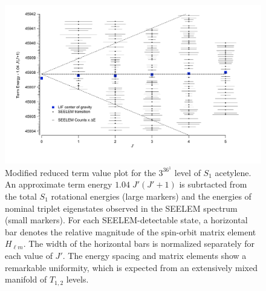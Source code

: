 
\begin{figure}
  \caption{Modified reduced term value plot for the $3^36^1$ 
    level of $S_1$ acetylene.  An approximate term energy $1.04 \;
    J'(J'+1)$ is subrtacted from the total $S_1$ rotational energies
    (large markers) and the energies of nominal triplet eigenstates
    observed in the SEELEM spectrum (small markers).  For each
    SEELEM-detectable state, a horizontal bar denotes the relative
    magnitude of the spin-orbit matrix element $H_{\ell m}$.  The
    width of the horizontal bars is normalized separately for each
    value of $J'$.  The energy spacing and matrix elements show a
    remarkable uniformity, which is expected from an extensively mixed
    manifold of $T_{1,2}$ levels.}
  \label{fig:unfold}
  \centering
  \vspace{15mm}
  \includegraphics[width=7in, trim=10mm 0mm 50mm 0mm, angle=90]{redterms-3361-unfolded}
\end{figure}


